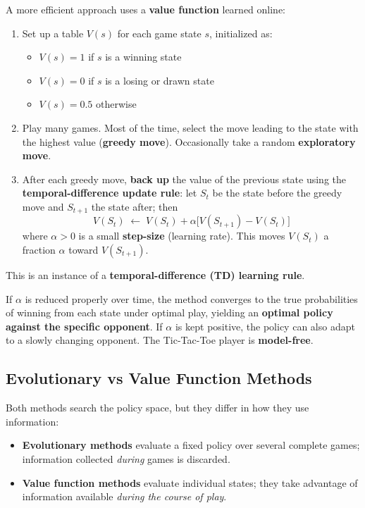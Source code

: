 \documentclass[11pt,a4paper]{article}
\theoremstyle{definition}
\theoremstyle{plain}
\theoremstyle{remark}
\begin{document}
A more efficient approach uses a \textbf{value function} learned online:

\begin{enumerate}
    \item Set up a table $V(s)$ for each game state $s$, initialized as:
    \begin{itemize}
        \item $V(s) = 1$ if $s$ is a winning state
        \item $V(s) = 0$ if $s$ is a losing or drawn state
        \item $V(s) = 0.5$ otherwise
    \end{itemize}
    \item Play many games. Most of the time, select the move leading to the state with the highest value (\textbf{greedy move}). Occasionally take a random \textbf{exploratory move}.
    \item After each greedy move, \textbf{back up} the value of the previous state using the \textbf{temporal-difference update rule}: let $S_t$ be the state before the greedy move and $S_{t+1}$ the state after; then
    \[
        V(S_t) \;\leftarrow\; V(S_t) + \alpha \bigl[V(S_{t+1}) - V(S_t)\bigr]
    \]
    where $\alpha > 0$ is a small \textbf{step-size} (learning rate). This moves $V(S_t)$ a fraction $\alpha$ toward $V(S_{t+1})$.
\end{enumerate}

This is an instance of a \textbf{temporal-difference (TD) learning rule}.

\begin{tcolorbox}[colback=blue!5!white,colframe=blue!60!black,title=\textbf{Convergence}]
If $\alpha$ is reduced properly over time, the method converges to the true probabilities of winning from each state under optimal play, yielding an \textbf{optimal policy against the specific opponent}. If $\alpha$ is kept positive, the policy can also adapt to a slowly changing opponent. The Tic-Tac-Toe player is \textbf{model-free}.
\end{tcolorbox}

\subsection{Evolutionary vs Value Function Methods}

Both methods search the policy space, but they differ in how they use information:
\begin{itemize}
    \item \textbf{Evolutionary methods} evaluate a fixed policy over several complete games; information collected \textit{during} games is discarded.
    \item \textbf{Value function methods} evaluate individual states; they take advantage of information available \textit{during the course of play}.
\end{itemize}
\end{document}
